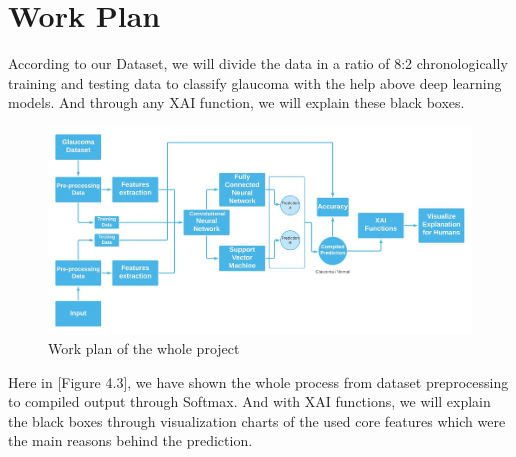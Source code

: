 \newpage
\section{Work Plan} 
According to our Dataset, we will divide the data in a ratio of 8:2 chronologically training and testing data to classify glaucoma with the help above deep learning models. And through any XAI function, we will explain these black boxes.

\begin{figure}[htbp]
\centering
\includegraphics[scale=0.75]{images/fig-3.png}
\caption{Work plan of the whole project}
\label{fig:x Work plan of the whole project}
\end{figure}

\vspace{5mm}
Here in [Figure 4.3], we have shown the whole process from dataset preprocessing to compiled output through Softmax. And with XAI functions, we will explain the black boxes through visualization charts of the used core features which were the main reasons behind the prediction.